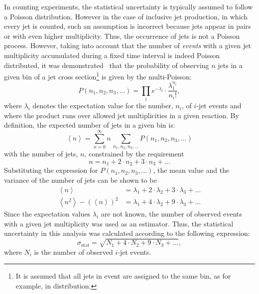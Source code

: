 In counting experiments, the statistical uncertainty is typically assumed to follow a Poisson distribution. However in the case of inclusive jet production, in which every jet is counted, such an assumption is incorrect because jets appear in pairs or with even higher multiplicity. Thus, the occurrence of jets is not a Poisson process. However, taking into account that the number of \textit{events} with a given jet multiplicity accumulated during a fixed time interval is indeed Poisson distributed, it was demonstrated~\cite{upub:juanstatcorrel} that the probability of observing $n$ jets in a given bin of a jet cross section\footnote{It is assumed that all jets in event are assigned to the same bin, as for example, in \qsq distribution.} is given by the multi-Poisson:
\begin{equation}
P\left(n_1, n_2, n_3, \ldots \right) = \prod_i{ e^{-\lambda_i} \cdot \frac{\lambda_1^{n_i}}{n_i!} },
\label{eq:multipoissonqsq}
\end{equation}
where $\lambda_i$ denotes the expectation value for the number, $n_i$, of $i$-jet events and where the product runs over allowed jet multiplicities in a given reaction. By definition, the expected number of jets in a given bin is:
\begin{equation}
 \left\langle n \right \rangle = \sum_{n=0}^{\infty}{n\,\sum_{n_1,n_2,n_3,\ldots}{P\left(n_1,n_2,n_3,\ldots\right)}}
\end{equation}
with the number of jets, $n$, constrained by the requirement 
\begin{equation}
n = n_1 + 2\cdot n_2 + 3\cdot n_3 + \ldots
\end{equation}
Substituting the expression for $P\left(n_1, n_2, n_3, \ldots \right)$, the mean value and the variance of the number of jets can be shown to be
\begin{align}
  \left\langle n \right \rangle &= \lambda_1 + 2\cdot\lambda_2 + 3\cdot\lambda_3 + \ldots\\
	\left\langle n^2 \right \rangle - \left( \left\langle n \right \rangle \right)^2 &= \lambda_1 + 4\cdot\lambda_2 + 9\cdot\lambda_3 +\ldots
\end{align}
Since the expectation values $\lambda_i$ are not known, the number of observed events with a given jet multiplicity was used as an estimator. Thus, the statistical uncertainty in this analysis was calculated according to the following expression:
\begin{equation}
\sigma_\text{stat} = \sqrt{N_1+4\cdot N_2 + 9\cdot N_3 + \ldots},
\end{equation}
where $N_i$ is the number of observed $i$-jet events.

